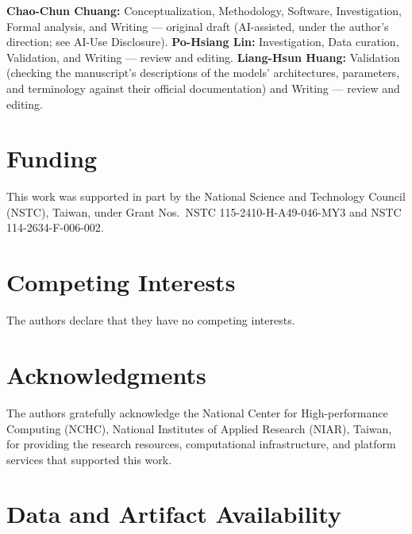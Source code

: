\documentclass[11pt]{article}
\begin{document}
\textbf{Chao-Chun Chuang:} Conceptualization, Methodology, Software, Investigation, Formal analysis, and Writing --- original draft (AI-assisted, under the author's direction; see AI-Use Disclosure). \textbf{Po-Hsiang Lin:} Investigation, Data curation, Validation, and Writing --- review and editing. \textbf{Liang-Hsun Huang:} Validation (checking the manuscript's descriptions of the models' architectures, parameters, and terminology against their official documentation) and Writing --- review and editing.

\section*{Funding}

\begin{sloppypar}
This work was supported in part by the National Science and Technology Council (NSTC), Taiwan, under Grant Nos.\ NSTC 115-2410-H-A49-046-MY3 and NSTC 114-2634-F-006-002.
\end{sloppypar}

\section*{Competing Interests}

The authors declare that they have no competing interests.

\section*{Acknowledgments}

The authors gratefully acknowledge the National Center for High-performance Computing (NCHC), National Institutes of Applied Research (NIAR), Taiwan, for providing the research resources, computational infrastructure, and platform services that supported this work.

\section*{Data and Artifact Availability}
\end{document}
